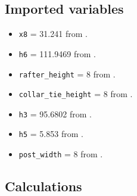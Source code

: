 \documentclass{article}\usepackage[]{graphicx}\usepackage[]{xcolor}
\begin{document}
\subsection{Imported variables} \label{rafter-lengths-connections-imported-variables}

\begin{itemize}
  \item \verb+x8+ = 31.241 from .
  \item \verb+h6+ = 111.9469 from .
  \item \verb+rafter_height+ = 8 from .
  \item \verb+collar_tie_height+ = 8 from . 
  \item \verb+h3+ = 95.6802 from .
  \item \verb+h5+ = 5.853 from .
  \item \verb+post_width+ = 8 from .
\end{itemize}



\subsection{Calculations} \label{rafter-lengths-connections-calculations}
\end{document}
